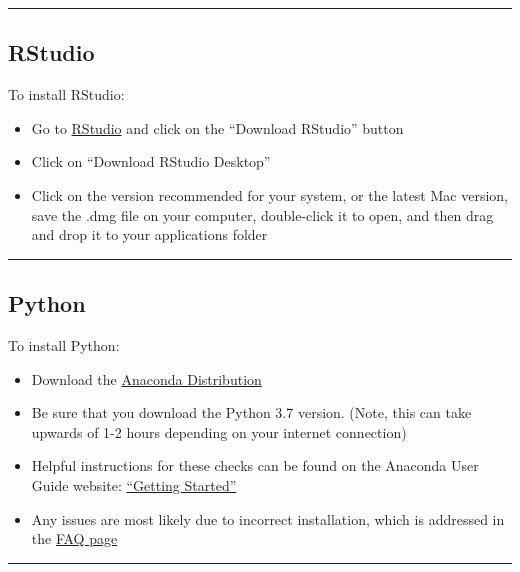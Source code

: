 \documentclass[]{book}
\providecommand{\tightlist}{%
  \setlength{\itemsep}{0pt}\setlength{\parskip}{0pt}}
\begin{document}
\begin{center}\rule{0.5\linewidth}{0.5pt}\end{center}

\subsection{RStudio}\label{rstudio}

To install RStudio:

\begin{itemize}
\tightlist
\item
  Go to \href{http://www.rstudio.com}{RStudio} and click on the
  ``Download RStudio'' button
\item
  Click on ``Download RStudio Desktop''
\item
  Click on the version recommended for your system, or the latest Mac
  version, save the .dmg file on your computer, double-click it to open,
  and then drag and drop it to your applications folder
\end{itemize}

\begin{center}\rule{0.5\linewidth}{0.5pt}\end{center}

\subsection{Python}\label{python}

To install Python:

\begin{itemize}
\tightlist
\item
  Download the \href{https://www.anaconda.com/distribution/}{Anaconda
  Distribution}
\item
  Be sure that you download the Python 3.7 version. (Note, this can take
  upwards of 1-2 hours depending on your internet connection)
\item
  Helpful instructions for these checks can be found on the Anaconda
  User Guide website:
  \href{https://docs.anaconda.com/anaconda/user-guide/getting-started/}{``Getting
  Started''}
\item
  Any issues are most likely due to incorrect installation, which is
  addressed in the
  \href{https://docs.anaconda.com/anaconda/user-guide/faq/}{FAQ page}
\end{itemize}

\begin{center}\rule{0.5\linewidth}{0.5pt}\end{center}
\end{document}
